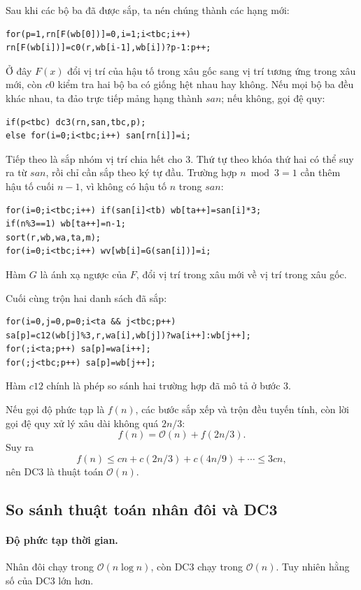 \documentclass[11pt]{article}
\newcommand{\Oh}{\mathcal{O}}
\begin{document}
Sau khi các bộ ba đã được sắp, ta nén chúng thành các hạng mới:
\begin{verbatim}
for(p=1,rn[F(wb[0])]=0,i=1;i<tbc;i++)
rn[F(wb[i])]=c0(r,wb[i-1],wb[i])?p-1:p++;
\end{verbatim}
Ở đây \(F(x)\) đổi vị trí của hậu tố trong xâu gốc sang vị trí tương ứng
trong xâu mới, còn \(c0\) kiểm tra hai bộ ba có giống hệt nhau hay không.
Nếu mọi bộ ba đều khác nhau, ta đảo trực tiếp mảng hạng thành \(san\); nếu
không, gọi đệ quy:
\begin{verbatim}
if(p<tbc) dc3(rn,san,tbc,p);
else for(i=0;i<tbc;i++) san[rn[i]]=i;
\end{verbatim}

Tiếp theo là sắp nhóm vị trí chia hết cho \(3\). Thứ tự theo khóa thứ hai có
thể suy ra từ \(san\), rồi chỉ cần sắp theo ký tự đầu. Trường hợp \(n\bmod
3=1\) cần thêm hậu tố cuối \(n-1\), vì không có hậu tố \(n\) trong \(san\):
\begin{verbatim}
for(i=0;i<tbc;i++) if(san[i]<tb) wb[ta++]=san[i]*3;
if(n%3==1) wb[ta++]=n-1;
sort(r,wb,wa,ta,m);
for(i=0;i<tbc;i++) wv[wb[i]=G(san[i])]=i;
\end{verbatim}
Hàm \(G\) là ánh xạ ngược của \(F\), đổi vị trí trong xâu mới về vị trí trong
xâu gốc.

Cuối cùng trộn hai danh sách đã sắp:
\begin{verbatim}
for(i=0,j=0,p=0;i<ta && j<tbc;p++)
sa[p]=c12(wb[j]%3,r,wa[i],wb[j])?wa[i++]:wb[j++];
for(;i<ta;p++) sa[p]=wa[i++];
for(;j<tbc;p++) sa[p]=wb[j++];
\end{verbatim}
Hàm \(c12\) chính là phép so sánh hai trường hợp đã mô tả ở bước 3.

Nếu gọi độ phức tạp là \(f(n)\), các bước sắp xếp và trộn đều tuyến tính, còn
lời gọi đệ quy xử lý xâu dài không quá \(2n/3\):
\[
  f(n) = \Oh(n) + f(2n/3).
\]
Suy ra
\[
  f(n) \le c n + c(2n/3) + c(4n/9) + \cdots \le 3cn,
\]
nên DC3 là thuật toán \(\Oh(n)\).

\subsection{So sánh thuật toán nhân đôi và DC3}

\paragraph{Độ phức tạp thời gian.}
Nhân đôi chạy trong \(\Oh(n\log n)\), còn DC3 chạy trong \(\Oh(n)\). Tuy
nhiên hằng số của DC3 lớn hơn.
\end{document}
